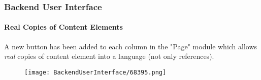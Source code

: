 \begin{frame}[fragile]
	\frametitle{Backend User Interface}
	\framesubtitle{Real Copies of Content Elements}

	A new button has been added to each column in the "Page" module which allows \textit{real} copies of content element
	into a language (not only references).

	\begin{figure}
		\texttt{[image: BackendUserInterface/68395.png]}
	\end{figure}

\end{frame}


